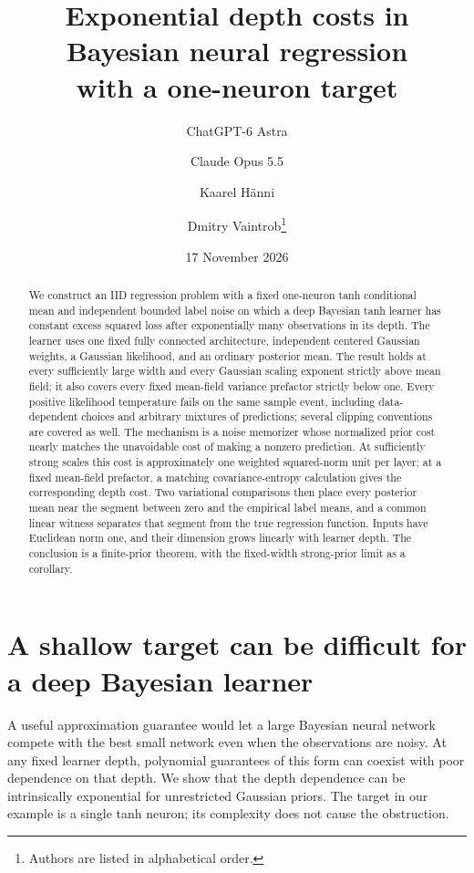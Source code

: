 \documentclass[11pt]{article}
\title{Exponential depth costs in Bayesian neural regression\\with a one-neuron target}
\author{ChatGPT-6 Astra \and Claude Opus 5.5 \and Kaarel H\"anni \and Dmitry Vaintrob\thanks{Authors are listed in alphabetical order.}}
\date{17 November 2026}
\begin{document}
\maketitle
\begin{abstract}
We construct an IID regression problem with a fixed one-neuron tanh conditional mean and independent bounded label noise on which a deep Bayesian tanh learner has constant excess squared loss after exponentially many observations in its depth. The learner uses one fixed fully connected architecture, independent centered Gaussian weights, a Gaussian likelihood, and an ordinary posterior mean. The result holds at every sufficiently large width and every Gaussian scaling exponent strictly above mean field; it also covers every fixed mean-field variance prefactor strictly below one. Every positive likelihood temperature fails on the same sample event, including data-dependent choices and arbitrary mixtures of predictions; several clipping conventions are covered as well. The mechanism is a noise memorizer whose normalized prior cost nearly matches the unavoidable cost of making a nonzero prediction. At sufficiently strong scales this cost is approximately one weighted squared-norm unit per layer; at a fixed mean-field prefactor, a matching covariance-entropy calculation gives the corresponding depth cost. Two variational comparisons then place every posterior mean near the segment between zero and the empirical label means, and a common linear witness separates that segment from the true regression function. Inputs have Euclidean norm one, and their dimension grows linearly with learner depth. The conclusion is a finite-prior theorem, with the fixed-width strong-prior limit as a corollary.
\end{abstract}

\section{A shallow target can be difficult for a deep Bayesian learner}
A useful approximation guarantee would let a large Bayesian neural network compete with the best small network even when the observations are noisy. At any fixed learner depth, polynomial guarantees of this form can coexist with poor dependence on that depth. We show that the depth dependence can be intrinsically exponential for unrestricted Gaussian priors. The target in our example is a single tanh neuron; its complexity does not cause the obstruction.
\end{document}
